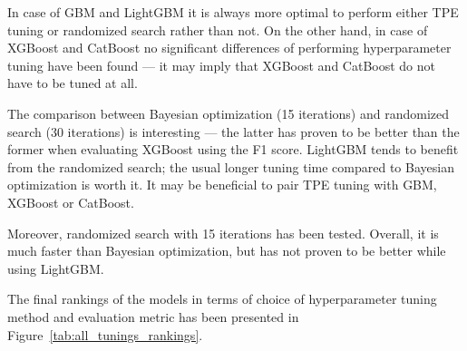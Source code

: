 \documentclass[magisterska, english]{pwr_wmat_praca_dyplomowa}
\theoremstyle{plain}
\numberwithin{theorem}{chapter}
\theoremstyle{definition}
\numberwithin{theorem}{chapter}
\begin{document}
In case of GBM and LightGBM it is always more optimal to perform either TPE tuning or randomized search rather than not. On the other hand, in case of XGBoost and CatBoost no significant differences of performing hyperparameter tuning have been found --- it may imply that XGBoost and CatBoost do not have to be tuned at all.

The comparison between Bayesian optimization (15 iterations) and randomized search (30 iterations) is interesting --- the latter has proven to be better than the former when evaluating XGBoost using the F1 score. LightGBM tends to benefit from the randomized search; the usual longer tuning time compared to Bayesian optimization is worth it. It may be beneficial to pair TPE tuning with GBM, XGBoost or CatBoost.

Moreover, randomized search with 15 iterations has been tested. Overall, it is much faster than Bayesian optimization, but has not proven to be better while using LightGBM.

The final rankings of the models in terms of choice of hyperparameter tuning method and evaluation metric has been presented in Figure~\ref{tab:all_tunings_rankings}. 
\end{document}
